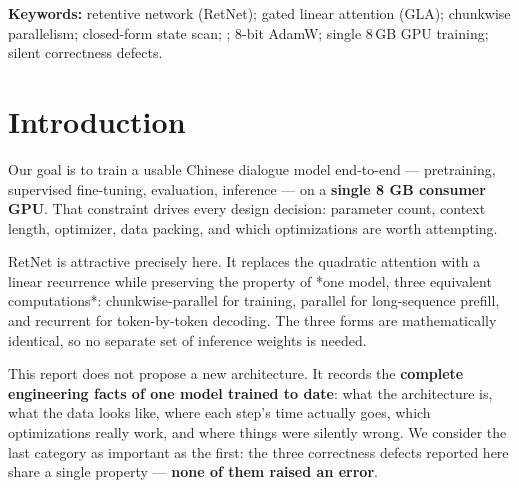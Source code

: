 \documentclass[11pt,openany]{article}
\begin{document}
\bigskip

{\small\textbf{Keywords:} retentive network (RetNet); gated linear attention (GLA); chunkwise
parallelism; closed-form state scan; ; 8-bit AdamW; single 8\,GB GPU
training; silent correctness defects.}

\clearpage

\renewcommand{\contentsname}{Contents}
\tableofcontents

\clearpage


\section{Introduction}

Our goal is to train a usable Chinese dialogue model end-to-end — pretraining, supervised fine-tuning, evaluation, inference — on a \textbf{single 8 GB consumer GPU}. That constraint drives every design decision: parameter count, context length, optimizer, data packing, and which optimizations are worth attempting.

RetNet is attractive precisely here. It replaces the quadratic attention with a linear recurrence while preserving the property of *one model, three equivalent computations*: chunkwise-parallel for training, parallel for long-sequence prefill, and recurrent for token-by-token decoding. The three forms are mathematically identical, so no separate set of inference weights is needed.

This report does not propose a new architecture. It records the \textbf{complete engineering facts of one model trained to date}: what the architecture is, what the data looks like, where each step's time actually goes, which optimizations really work, and where things were silently wrong. We consider the last category as important as the first: the three correctness defects reported here share a single property — \textbf{none of them raised an error}.

\reportrule
\end{document}
